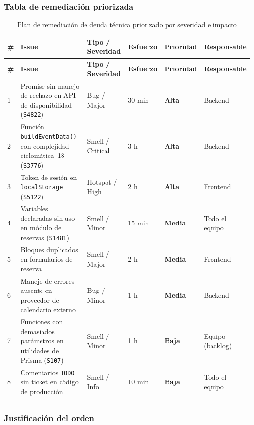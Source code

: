 \documentclass{article}
\begin{document}
\subsubsection{Tabla de remediación priorizada}

\begin{longtable}{|p{0.5cm}|p{4.2cm}|p{2.1cm}|p{1.5cm}|p{1.5cm}|p{2.1cm}|}
\hline
\textbf{\#} & \textbf{Issue} & \textbf{Tipo / Severidad} & \textbf{Esfuerzo} & \textbf{Prioridad} & \textbf{Responsable} \\
\hline
\endfirsthead
\hline
\textbf{\#} & \textbf{Issue} & \textbf{Tipo / Severidad} & \textbf{Esfuerzo} & \textbf{Prioridad} & \textbf{Responsable} \\
\hline
\endhead

1 & Promise sin manejo de rechazo en API de disponibilidad (\texttt{S4822}) & Bug / Major & 30 min & \textbf{Alta} & Backend \\
\hline
2 & Función \texttt{buildEventData()} con complejidad ciclomática~18 (\texttt{S3776}) & Smell / Critical & 3 h & \textbf{Alta} & Backend \\
\hline
3 & Token de sesión en \texttt{localStorage} (\texttt{S5122}) & Hotspot / High & 2 h & \textbf{Alta} & Frontend \\
\hline
4 & Variables declaradas sin uso en módulo de reservas (\texttt{S1481}) & Smell / Minor & 15 min & \textbf{Media} & Todo el equipo \\
\hline
5 & Bloques duplicados en formularios de reserva & Smell / Major & 2 h & \textbf{Media} & Frontend \\
\hline
6 & Manejo de errores ausente en proveedor de calendario externo & Bug / Minor & 1 h & \textbf{Media} & Backend \\
\hline
7 & Funciones con demasiados parámetros en utilidades de Prisma (\texttt{S107}) & Smell / Minor & 1 h & \textbf{Baja} & Equipo (backlog) \\
\hline
8 & Comentarios \texttt{TODO} sin ticket en código de producción & Smell / Info & 10 min & \textbf{Baja} & Todo el equipo \\
\hline
\caption{Plan de remediación de deuda técnica priorizado por severidad e impacto}
\label{tab:remediation}
\end{longtable}

\subsubsection{Justificación del orden}
\end{document}
